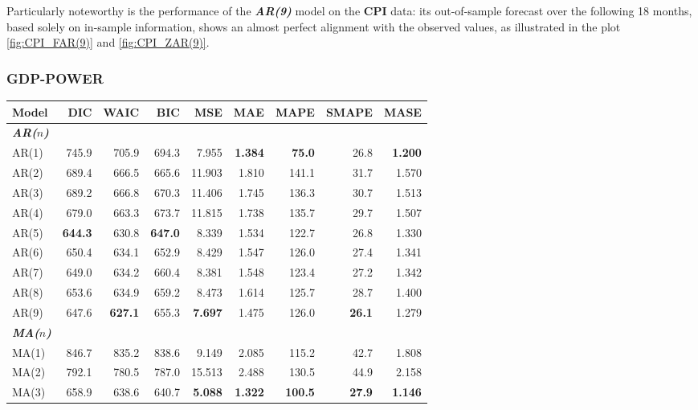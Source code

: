 \documentclass{Configuration_Files/PoliMi3i_thesis}
\begin{document}
Particularly noteworthy is the performance of the \textbf{\textit{AR(9)}} model on the \textbf{CPI} data: its out-of-sample forecast over the following 18 months, based solely on in-sample information, shows an almost perfect alignment with the observed values, as illustrated in the plot \ref{fig:CPI_FAR(9)} and \ref{fig:CPI_ZAR(9)}.

\subsubsection{GDP-POWER}
\begin{table}[H]
  \centering
  \small
  \begin{tabular}{@{}lrrrrrrrr@{}}
    \toprule
    \textbf{Model} & \textbf{DIC} & \textbf{WAIC} & \textbf{BIC} & \textbf{MSE} & \textbf{MAE} & \textbf{MAPE} & \textbf{SMAPE} & \textbf{MASE} \\
    \midrule
\textbf{\textit{AR($n$)}} \\
    AR(1)  & 745.9 & 705.9 & 694.3 & 7.955 & \textbf{1.384} & \textbf{75.0} & 26.8  & \textbf{1.200} \\
    AR(2)  & 689.4 & 666.5 & 665.6 & 11.903 & 1.810 & 141.1 & 31.7 & 1.570 \\
    AR(3)  & 689.2 & 666.8 & 670.3 & 11.406 & 1.745 & 136.3 & 30.7 & 1.513 \\
    AR(4)  & 679.0 & 663.3 & 673.7 & 11.815 & 1.738 & 135.7 & 29.7  & 1.507 \\
    AR(5)  & \textbf{644.3} & 630.8 & \textbf{647.0} & 8.339 & 1.534 & 122.7 & 26.8 & 1.330 \\
    AR(6)  & 650.4 & 634.1 & 652.9 & 8.429 & 1.547 & 126.0 & 27.4 & 1.341 \\
    AR(7)  & 649.0 & 634.2 & 660.4 & 8.381 & 1.548 & 123.4 & 27.2 & 1.342 \\
    AR(8)  & 653.6 & 634.9 & 659.2 & 8.473 & 1.614 & 125.7 & 28.7 & 1.400 \\
    AR(9)  & 647.6 & \textbf{627.1} & 655.3 & \textbf{7.697} & 1.475 & 126.0 & \textbf{26.1}  & 1.279 \\
    \midrule
\textbf{\textit{MA($n$)}} \\
    MA(1)  & 846.7 & 835.2 & 838.6 & 9.149  & 2.085 & 115.2 & 42.7 & 1.808 \\
    MA(2)  & 792.1 & 780.5 & 787.0 & 15.513 & 2.488 & 130.5 & 44.9 & 2.158 \\
    MA(3)  & 658.9 & 638.6 & 640.7 & \textbf{5.088}  & \textbf{1.322} & \textbf{100.5} & \textbf{27.9} & \textbf{1.146} \\

\end{tabular}
\end{table}
\end{document}
